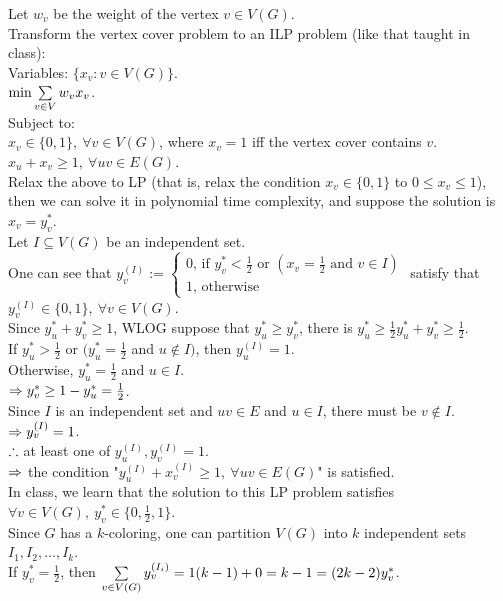 \begin{pr}
Let $w_v$ be the weight of the vertex $v\in V(G)$.\\
Transform the vertex cover problem to an ILP problem (like that taught in class):\\
Variables: $\{x_v:v\in V(G)\}$.\\
$\min\sum\limits_{v\in V}w_vx_v$.\\
Subject to:\\
$x_v\in\{0, 1\},\ \forall v\in V(G)$, where $x_v=1$ iff the vertex cover contains $v$.\\
$x_u+x_v\geq1,\ \forall uv\in E(G)$.\\
Relax the above to LP (that is, relax the condition $x_v\in\{0, 1\}$ to $0\leq x_v\leq1$), then we can solve it in polynomial time complexity, and suppose the solution is $x_v=y_v^*$.\\
Let $I\subseteq V(G)$ be an independent set.\\
One can see that $y_v^{(I)}:=\begin{cases}
0\text{, if }y_v^*<\frac12\text{ or }(x_v=\frac12\text{ and }v\in I)\\
1\text{, otherwise}
\end{cases}$ satisfy that $y_v^{(I)}\in\{0, 1\},\ \forall v\in V(G)$.\\
Since $y_u^*+y_v^*\geq1$, WLOG suppose that $y_u^*\geq y_v^*$, there is $y_u^*\geq\frac12{y_u^*+y_v^*}\geq\frac12$.\\
If $y_u^*>\frac12$ or $(y_u^*=\frac12$ and $u\notin I)$, then $y_u^{(I)}=1$.\\
Otherwise, $y_u^*=\frac12$ and $u\in I$.\\
$\Rightarrow y_v^*\geq1-y_u^*=\frac12$.\\
Since $I$ is an independent set and $uv\in E$ and $u\in I$, there must be $v\notin I$.\\
$\Rightarrow y_v^{(I)}=1$.\\
$\therefore$ at least one of $y_u^{(I)}, y_v^{(I)}=1$.\\
$\Rightarrow$ the condition "$y_u^{(I)}+x_v^{(I)}\geq1,\ \forall uv\in E(G)$" is satisfied.\\
In class, we learn that the solution to this LP problem satisfies $\forall v\in V(G),\ y_v^*\in\{0, \frac12, 1\}$.\\
Since $G$ has a $k$-coloring, one can partition $V(G)$ into $k$ independent sets $I_1, I_2, \dots, I_k$.\\
If $y_v^*=\frac12$, then $\sum\limits_{v\in V(G)}y_v^{(I_i)}=1(k-1)+0=k-1=(2k-2)y_v^*$.\\

\end{pr}
